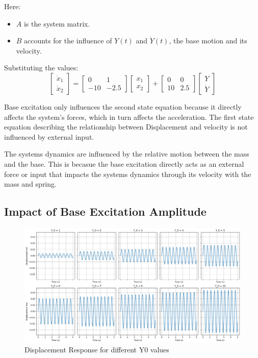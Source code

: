\documentclass[12pt,a4paper]{article}
\begin{document}
Here:
\begin{itemize}
    \item \( A \) is the system matrix.
    \item \( B \) accounts for the influence of \( Y(t) \) and \( \dot{Y}(t) \), the base motion and its velocity.
\end{itemize}

Substituting the values:
\[
\begin{bmatrix}
\dot{x}_1 \\
\dot{x}_2
\end{bmatrix}
=
\begin{bmatrix}
0 & 1 \\
-10 & -2.5
\end{bmatrix}
\begin{bmatrix}
x_1 \\
x_2
\end{bmatrix}
+
\begin{bmatrix}
0 & 0 \\
10 & 2.5
\end{bmatrix}
\begin{bmatrix}
Y \\
\dot{Y}
\end{bmatrix}
\]

\vspace{5pt}

Base excitation only influences the second state equation because it directly affects the system's forces, which in turn affects the acceleration. The first state equation describing the relationship between Displacement and velocity is not influenced by external input.

The systems dynamics are influenced by the relative motion between the mass and the base. This is becasue the base excitation directly acts as an external force or input that impacts the systems dynamics through its velocity with the mass and spring. 



\subsection{Impact of Base Excitation Amplitude}
\begin{figure}[H]
    \centering
    \includegraphics[width=1\textwidth]{disp_response.png} 
    \caption{Displacement Response for different Y0 values}
    \label{fig:system}
\end{figure}
{\vspace{10pt}}
\end{document}
